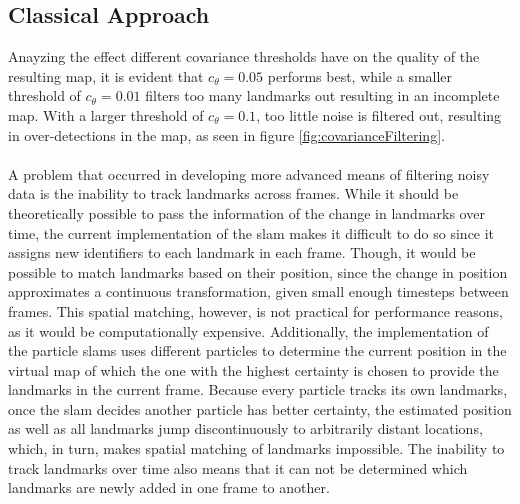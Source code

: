 \subsection{Classical Approach}
$ $\\Anayzing the effect different covariance thresholds have on the quality of the resulting map, it is evident that $c_\theta=0.05$ performs best, while a smaller threshold of $c_\theta=0.01$ filters too many landmarks out resulting in an incomplete map. With a larger threshold of $c_\theta=0.1$, too little noise is filtered out, resulting in over-detections in the map, as seen in figure \ref{fig:covarianceFiltering}.\\ 
\\
A problem that occurred in developing more advanced means of filtering noisy data is the inability to track landmarks across frames. While it should be theoretically possible to pass the information of the change in landmarks over time, the current implementation of the \ac{slam} makes it difficult to do so since it assigns new identifiers to each landmark in each frame. Though, it would be possible to match landmarks based on their position, since the change in position approximates a continuous transformation, given small enough timesteps between frames. This spatial matching, however, is not practical for performance reasons, as it would be computationally expensive. Additionally, the implementation of the particle \ac{slam}s uses different particles to determine the current position in the virtual map of which the one with the highest certainty is chosen to provide the landmarks in the current frame. Because every particle tracks its own landmarks, once the \ac{slam} decides another particle has better certainty, the estimated position as well as all landmarks jump discontinuously to arbitrarily distant locations, which, in turn, makes spatial matching of landmarks impossible. The inability to track landmarks over time also means that it can not be determined which landmarks are newly added in one frame to another.

